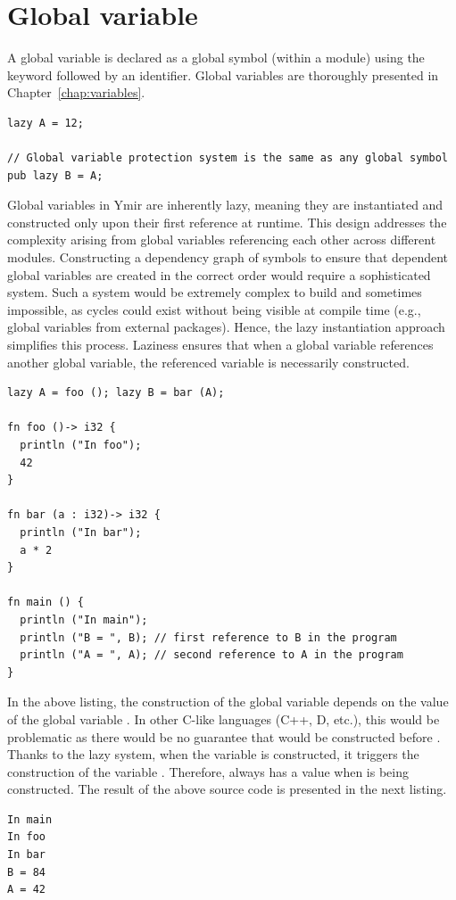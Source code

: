 \section{Global variable}%
\label{sec:global_variables}

A global variable is declared as a global symbol (within a module) using the
keyword  followed by an identifier. Global variables are thoroughly
presented in Chapter~\ref{chap:variables}.

\begin{lstlisting}[style=coloredverbatim]
lazy A = 12;

// Global variable protection system is the same as any global symbol
pub lazy B = A;
\end{lstlisting}

Global variables in Ymir are inherently lazy, meaning they are instantiated and
constructed only upon their first reference at runtime. This design addresses
the complexity arising from global variables referencing each other across
different modules. Constructing a dependency graph of symbols to ensure that
dependent global variables are created in the correct order would require a
sophisticated system. Such a system would be extremely complex to build and
sometimes impossible, as cycles could exist without being visible at compile
time (e.g., global variables from external packages). Hence, the lazy
instantiation approach simplifies this process. Laziness ensures that when a
global variable references another global variable, the referenced variable is
necessarily constructed.

\begin{lstlisting}[style=coloredverbatim]
lazy A = foo (); lazy B = bar (A);

fn foo ()-> i32 {
  println ("In foo");
  42
}

fn bar (a : i32)-> i32 {
  println ("In bar");
  a * 2
}

fn main () {
  println ("In main");
  println ("B = ", B); // first reference to B in the program
  println ("A = ", A); // second reference to A in the program
}
\end{lstlisting}

In the above listing, the construction of the global variable  depends
on the value of the global variable . In other C-like languages (C++,
D, etc.), this would be problematic as there would be no guarantee that
 would be constructed before . Thanks to the lazy system, when
the variable  is constructed, it triggers the construction of the
variable . Therefore,  always has a value when  is
being constructed. The result of the above source code is presented in the next
listing.

\begin{lstlisting}[style=bashVerb, escapechar=@+]
In main
In foo
In bar
B = 84
A = 42
\end{lstlisting}

\vfill%
\pagebreak
